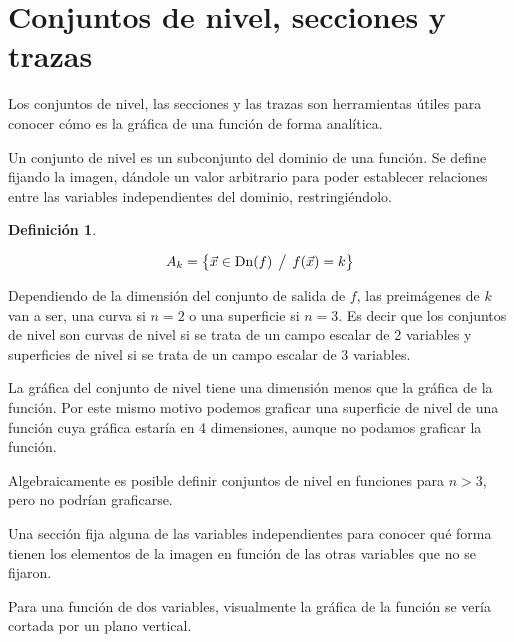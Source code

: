 \documentclass[a5paper,12pt,twoside]{book}
\newtheorem{defn}{{Definición}}[chapter]
\begin{document}
\section{Conjuntos de nivel, secciones y trazas}

Los conjuntos de nivel, las secciones y las trazas son herramientas útiles para conocer cómo es la gráfica de una función de forma analítica.



Un conjunto de nivel es un subconjunto del dominio de una función.
Se define fijando la imagen, dándole un valor arbitrario para poder establecer relaciones entre las variables independientes del dominio, restringiéndolo.

\begin{mdframed}[style=DefinitionFrame]
    \begin{defn}
    \end{defn}
    \begin{equation*}
        A_{k} = \big\{ \Vec{x} \in \operatorname{Dn}(f) \hspace{1ex} \big/ \hspace{1ex} f(\Vec{x})=k \big\}
    \end{equation*}
\end{mdframed}

Dependiendo de la dimensión del conjunto de salida de $f$, las preimágenes de $k$ van a ser, una curva si $n=2$ o una superficie si $n=3$.
Es decir que los conjuntos de nivel son curvas de nivel si se trata de un campo escalar de 2 variables y superficies de nivel si se trata de un campo escalar de 3 variables.

La gráfica del conjunto de nivel tiene una dimensión menos que la gráfica de la función.
Por este mismo motivo podemos graficar una superficie de nivel de una función cuya gráfica estaría en 4 dimensiones, aunque no podamos graficar la función.

Algebraicamente es posible definir conjuntos de nivel en funciones para $n>3$, pero no podrían graficarse.



Una sección fija alguna de las variables independientes para conocer qué forma tienen los elementos de la imagen en función de las otras variables que no se fijaron.

Para una función de dos variables, visualmente la gráfica de la función se vería cortada por un plano vertical.
\end{document}
